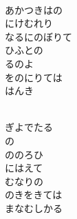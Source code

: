 \documentclass[10pt,b5j]{tarticle} %
\begin{document}
\begin{enumerate}
\begin{minipage}[c]{\blocksize}
    \end{minipage}
    \begin{minipage}[c]{\blocksize}
        
        \vspace{\linespace}
        \item~\\
        あかつきはの\\
        にけむれり\\
        なるにのぼりて\\
        ひふとの\\
        るのよ\\
        をのにりては\\
        はんき
        
    \end{minipage}
    \begin{minipage}[c]{\blocksize}
        
        \vspace{\linespace}
        \item~\\
        ぎよでたる\\
        の\\
        ののろひ\\
        にはえて\\
        むなりの\\
        のきをきては\\
        まなむしかる
    
    \end{minipage}
\end{enumerate} %
\end{document}
